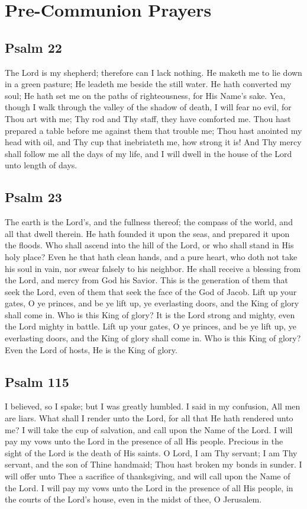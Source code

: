 \section{Pre-Communion Prayers}

\subsection{Psalm 22}

The Lord is my shepherd; therefore can I lack nothing. He maketh me to lie down in a green pasture; He leadeth me beside the still water. He hath converted my soul; He hath set me on the paths of righteousness, for His Name’s sake. Yea, though I walk through the valley of the shadow of death, I will fear no evil, for Thou art with me; Thy rod and Thy staff, they have comforted me. Thou hast prepared a table before me against them that trouble me; Thou hast anointed my head with oil, and Thy cup that inebriateth me, how strong it is! And Thy mercy shall follow me all the days of my life, and I will dwell in the house of the Lord unto length of days.

\subsection{Psalm 23}

The earth is the Lord’s, and the fullness thereof; the compass of the world, and all that dwell therein. He hath founded it upon the seas, and prepared it upon the floods. Who shall ascend into the hill of the Lord, or who shall stand in His holy place? Even he that hath clean hands, and a pure heart, who doth not take his soul in vain, nor swear falsely to his neighbor. He shall receive a blessing from the Lord, and mercy from God his Savior. This is the generation of them that seek the Lord, even of them that seek the face of the God of Jacob. Lift up your gates, O ye princes, and be ye lift up, ye everlasting doors, and the King of glory shall come in. Who is this King of glory? It is the Lord strong and mighty, even the Lord mighty in battle. Lift up your gates, O ye princes, and be ye lift up, ye everlasting doors, and the King of glory shall come in. Who is this King of glory? Even the Lord of hosts, He is the King of glory.

\subsection{Psalm 115}

I believed, so I spake; but I was greatly humbled. I said in my confusion, All men are liars. What shall I render unto the Lord, for all that He hath rendered unto me? I will take the cup of salvation, and call upon the Name of the Lord. I will pay my vows unto the Lord in the presence of all His people. Precious in the sight of the Lord is the death of His saints. O Lord, I am Thy servant; I am Thy servant, and the son of Thine handmaid; Thou hast broken my bonds in sunder. I will offer unto Thee a sacrifice of thanksgiving, and will call upon the Name of the Lord. I will pay my vows unto the Lord in the presence of all His people, in the courts of the Lord’s house, even in the midst of thee, O Jerusalem.

